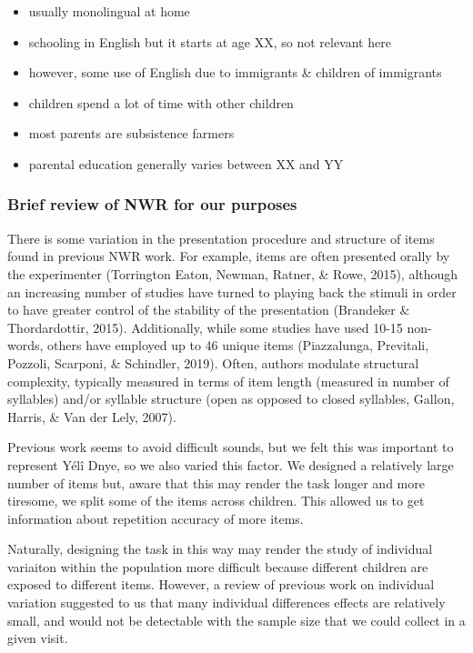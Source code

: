 \documentclass[english,,man,floatsintext]{apa6}
\providecommand{\tightlist}{%
  \setlength{\itemsep}{0pt}\setlength{\parskip}{0pt}}
\begin{document}
\begin{itemize}
\tightlist
\item
  usually monolingual at home
\item
  schooling in English but it starts at age XX, so not relevant here
\item
  however, some use of English due to immigrants \& children of
  immigrants
\item
  children spend a lot of time with other children
\item
  most parents are subsistence farmers
\item
  parental education generally varies between XX and YY
\end{itemize}

\subsubsection{Brief review of NWR for our
purposes}\label{brief-review-of-nwr-for-our-purposes}

There is some variation in the presentation procedure and structure of
items found in previous NWR work. For example, items are often presented
orally by the experimenter (Torrington Eaton, Newman, Ratner, \& Rowe,
2015), although an increasing number of studies have turned to playing
back the stimuli in order to have greater control of the stability of
the presentation (Brandeker \& Thordardottir, 2015). Additionally, while
some studies have used 10-15 non-words, others have employed up to 46
unique items (Piazzalunga, Previtali, Pozzoli, Scarponi, \& Schindler,
2019). Often, authors modulate structural complexity, typically measured
in terms of item length (measured in number of syllables) and/or
syllable structure (open as opposed to closed syllables, Gallon, Harris,
\& Van der Lely, 2007).

Previous work seems to avoid difficult sounds, but we felt this was
important to represent Yélî Dnye, so we also varied this factor. We
designed a relatively large number of items but, aware that this may
render the task longer and more tiresome, we split some of the items
across children. This allowed us to get information about repetition
accuracy of more items.

Naturally, designing the task in this way may render the study of
individual variaiton within the population more difficult because
different children are exposed to different items. However, a review of
previous work on individual variation suggested to us that many
individual differences effects are relatively small, and would not be
detectable with the sample size that we could collect in a given visit.
\end{document}
